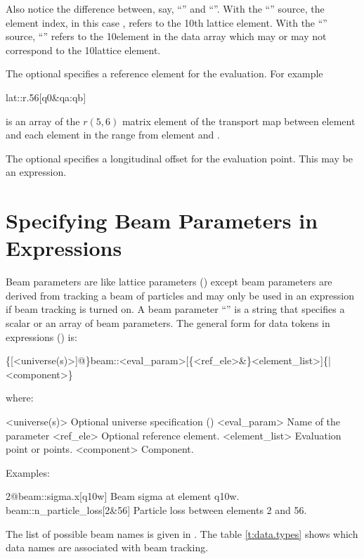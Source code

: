 Also notice the difference between, say, ``'' and ``''.
With the ``'' source, the element index, in this case , refers to the 10th lattice
element. With the ``'' source, ``'' refers to the 10\Th element in the
 data array which may or may not correspond to the 10\Th lattice element.

The optional  specifies a reference element for the evaluation. For example
\begin{example}
  lat::r.56[q0\&qa:qb]
\end{example}  
is an array of the $r(5,6)$ matrix element of the transport map between element  and each
element in the range from element  and .

The optional  specifies a longitudinal offset for the evaluation point. This may be
an expression.

\section{Specifying Beam Parameters in Expressions}
\label{s:beam.token}

Beam parameters are like lattice parameters () except beam parameters are derived
from tracking a beam of particles and may only be used in an expression if beam tracking is turned
on.  A beam parameter ``'' is a string that specifies a scalar or an array of beam
parameters. The general form for data tokens in expressions () is:
\begin{example}
  \{[<universe(s)>]@\}beam::<eval_param>[\{<ref_ele>&\}<element_list>]\{|<component>\}
\end{example}
where:
\begin{example}
  <universe(s)>       Optional universe specification ()
  <eval_param>        Name of the parameter
  <ref_ele>           Optional reference element.
  <element_list>      Evaluation point or points.
  <component>         Component. 
\end{example}
Examples:
\begin{example}
  2@beam::sigma.x[q10w]           Beam sigma at element q10w.
  beam::n_particle_loss[2&56]     Particle loss between elements 2 and 56.
\end{example}

The list of possible beam  names is given in . The table
\ref{t:data.types} shows which data names are associated with beam tracking.

